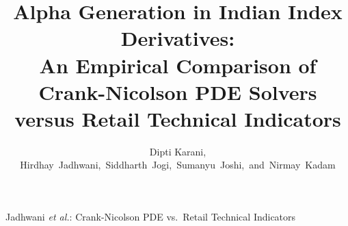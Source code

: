 \documentclass[10pt,journal,compsoc]{IEEEtran}
\begin{document}
\title{Alpha Generation in Indian Index Derivatives:\\An Empirical Comparison of Crank-Nicolson PDE Solvers\\versus Retail Technical Indicators}

\author{Dipti Karani, Hirdhay~Jadhwani,~Siddharth~Jogi,~Sumanyu~Joshi,~and~Nirmay~Kadam%
%
}

%
{Jadhwani \MakeLowercase{\textit{et al.}}: Crank-Nicolson PDE vs.\ Retail Technical Indicators}
\end{document}
